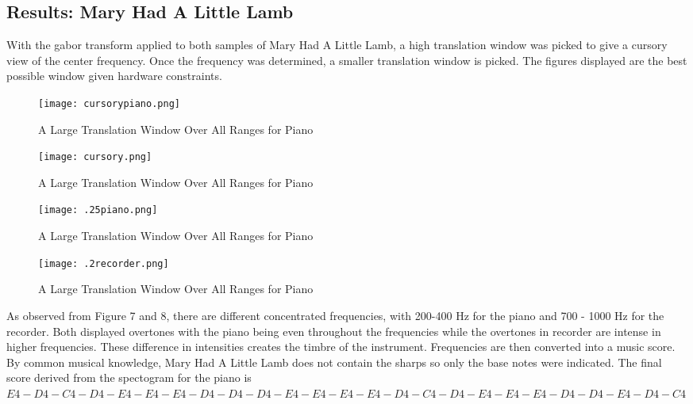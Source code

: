 \documentclass[a4paper,12pt]{article}
\begin{document}
\subsection{Results: Mary Had A Little Lamb}
With the gabor transform applied to both samples of Mary Had A Little Lamb, a high translation window was picked to give a cursory view of the center frequency. Once the frequency was determined, a smaller translation window is picked. The figures displayed are the best possible window given hardware constraints.
\begin{figure}[!h]
	
	\begin{minipage}[t]{7 cm}
		\centering
		\texttt{[image: cursorypiano.png]}
		\caption{A Large Translation Window Over All Ranges for Piano}
	\end{minipage}
	\hspace{1cm}
	\begin{minipage}[t]{7 cm}
		\centering
		\texttt{[image: cursory.png]}
		\caption{A Large Translation Window Over All Ranges for Piano}
	\end{minipage}
\end{figure}
\begin{figure}
	
	\begin{minipage}[t]{7cm}
		\centering
		\texttt{[image: .25piano.png]}
		\caption{A Large Translation Window Over All Ranges for Piano}
	\end{minipage}
	\hspace{1cm}
	\begin{minipage}[t]{7cm}
		\centering
		\texttt{[image: .2recorder.png]}
		\caption{A Large Translation Window Over All Ranges for Piano}
	\end{minipage}
\end{figure}
\newpage
As observed from Figure 7 and 8, there are different concentrated frequencies, with 200-400 Hz for the piano and 700 - 1000 Hz for the recorder. Both displayed overtones with the piano being even throughout the frequencies while the overtones in recorder are intense in higher frequencies. These difference in intensities creates the timbre of the instrument. 
\newline
Frequencies are then converted into a music score. By common musical knowledge, Mary Had A Little Lamb does not contain the sharps so only the base notes were indicated.
\newline The final score derived from the spectogram for the piano is \newline$E4-D4-C4-D4-E4-E4-E4-D4-D4-D4-E4-E4-E4-E4-D4-C4-D4-E4-E4-E4-D4-D4-E4-D4-C4$
\newline 
\end{document}
